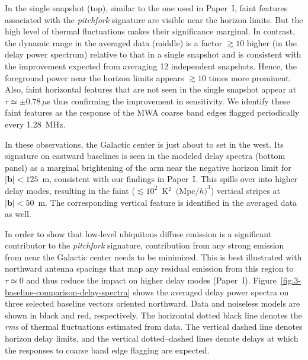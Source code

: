 \documentclass[preprint2,apjl,numberedappendix,twocolappendix,appendixfloats]{emulateapj}
\begin{document}
\begin{figure}[htb]
\end{figure}

In the single snapshot (top), similar to the one used in Paper~I, faint features associated with the {\it pitchfork} signature are visible near the horizon limits. But the high level of thermal fluctuations makes their significance marginal. In contrast, the dynamic range in the averaged data (middle) is a factor $\gtrsim 10$ higher (in the delay power spectrum) relative to that in a single snapshot and is consistent with the improvement expected from averaging 12 independent snapshots. Hence, the foreground power near the horizon limits appears $\gtrsim 10$ times more prominent. Also, faint horizontal features that are not seen in the single snapshot appear at $\tau \simeq \pm 0.78\,\mu$s thus confirming the improvement in sensitivity. We identify these faint features as the response of the MWA coarse band edges flagged periodically every 1.28~MHz. 

In these observations, the Galactic center is just about to set in the west. Its signature on eastward baselines is seen in the modeled delay spectra (bottom panel) as a marginal brightening of the arm near the negative horizon limit for $|\boldsymbol{b}| < 125$~m, consistent with our findings in Paper~I. This spills over into higher delay modes, resulting in the faint ($\lesssim 10^2$~K$^2$~$($Mpc$/h)^3$) vertical stripes at $|\boldsymbol{b}| < 50$~m. The corresponding vertical feature is identified in the averaged data as well.

In order to show that low-level ubiquitous diffuse emission is a significant contributor to the {\it pitchfork} signature, contribution from any strong emission from near the Galactic center needs to be minimized. This is best illustrated with northward antenna spacings that map any residual emission from this region to $\tau\simeq 0$ and thus reduce the impact on higher delay modes (Paper~I). Figure~\ref{fig:3-baseline-comparison-delay-spectra} shows the averaged delay power spectra on three selected baseline vectors oriented northward. Data and noiseless models are shown in black and red, respectively. The horizontal dotted black line denotes the {\it rms} of thermal fluctuations estimated from data. The vertical dashed line denotes horizon delay limits, and the vertical dotted--dashed lines denote delays at which the responses to coarse band edge flagging are expected.
\end{document}
